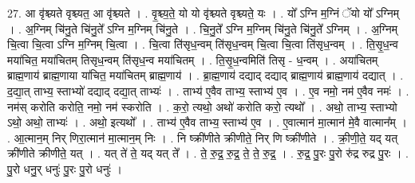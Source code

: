 \documentclass[17pt]{extarticle}
\begin{document}
27. आ वृ॑श्च्यते वृश्च्यत॒ आ वृ॑श्च्यते । . वृ॒श्च्य॒ते॒ यो यो वृ॑श्च्यते वृश्च्यते॒ यः । . यो᳚ ऽग्नि म॒ग्निं ॅयो यो᳚ ऽग्निम् । . अ॒ग्निम् चि॑नु॒ते चि॑नु॒ते᳚ ऽग्नि म॒ग्निम् चि॑नु॒ते । . चि॒नु॒ते᳚ ऽग्नि म॒ग्निम् चि॑नु॒ते चि॑नु॒ते᳚ ऽग्निम् । . अ॒ग्निम् चि॒त्वा चि॒त्वा ऽग्नि म॒ग्निम् चि॒त्वा । . चि॒त्वा ति॑सृध॒न्वम् ति॑सृध॒न्वम् चि॒त्वा चि॒त्वा ति॑सृध॒न्वम् । . ति॒सृ॒ध॒न्व मया॑चित॒ मया॑चितम् तिसृध॒न्वम् ति॑सृध॒न्व मया॑चितम् । . ति॒सृ॒ध॒न्वमिति॑ तिसृ - ध॒न्वम् । . अया॑चितम् ब्राह्म॒णाय॑ ब्राह्म॒णाया या॑चित॒ मया॑चितम् ब्राह्म॒णाय॑ । . ब्रा॒ह्म॒णाय॑ दद्याद् दद्याद् ब्राह्म॒णाय॑ ब्राह्म॒णाय॑ दद्यात् । . द॒द्या॒त् ताभ्य॒ स्ताभ्यो॑ दद्याद् दद्या॒त् ताभ्यः॑ । . ताभ्य॑ ए॒वैव ताभ्य॒ स्ताभ्य॑ ए॒व । . ए॒व नमो॒ नम॑ ए॒वैव नमः॑ । . नम॑स् करोति करोति॒ नमो॒ नम॑ स्करोति । . क॒रो॒ त्यथो॒ अथो॑ करोति करो॒ त्यथो᳚ । . अथो॒ ताभ्य॒ स्ताभ्यो ऽथो॒ अथो॒ ताभ्यः॑ । . अथो॒ इत्यथो᳚ । . ताभ्य॑ ए॒वैव ताभ्य॒ स्ताभ्य॑ ए॒व । . ए॒वात्मान॑ मा॒त्मान॑ मे॒वै वात्मान᳚म् । . आ॒त्मान॒म् निर् णिरा॒त्मान॑ मा॒त्मान॒म् निः । . नि ष्क्री॑णीते क्रीणीते॒ निर् णि ष्क्री॑णीते । . क्री॒णी॒ते॒ यद् यत् क्री॑णीते क्रीणीते॒ यत् । . यत् ते॑ ते॒ यद् यत् ते᳚ । . ते॒ रु॒द्र॒ रु॒द्र॒ ते॒ ते॒ रु॒द्र॒ । . रु॒द्र॒ पु॒रः पु॒रो रु॑द्र रुद्र पु॒रः । . पु॒रो धनु॒र् धनुः॑ पु॒रः पु॒रो धनुः॑ । \newline
\end{document}
